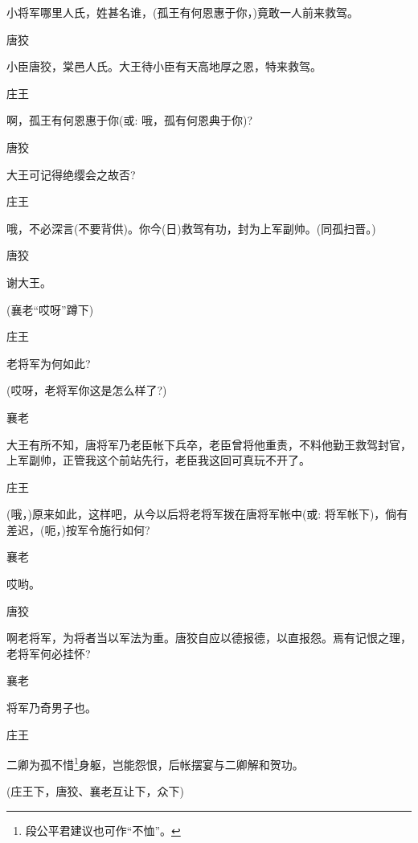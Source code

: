{小将军哪里人氏，姓甚名谁，(孤王有何恩惠于你，)竟敢一人前来救驾。

唐狡\hspace{30pt}~

小臣唐狡，棠邑人氏。大王待小臣有天高地厚之恩，特来救驾。

庄王\hspace{30pt}~

啊，孤王有何恩惠于你({\akai 或}: 哦，孤有何恩典于你)?

唐狡\hspace{30pt}~

大王可记得绝缨会之故否?

庄王

哦，不必深言(不要背供)。你今(日)救驾有功，封为上军副帅。(同孤扫晋。)

唐狡\hspace{30pt}~

谢大王。

(襄老``哎呀''蹲下)

庄王\hspace{30pt}~

老将军为何如此?

(哎呀，老将军你这是怎么样了?)

襄老

大王有所不知，唐将军乃老臣帐下兵卒，老臣曾将他重责，不料他勤王救驾封官，上军副帅，正管我这个前站先行，老臣我这回可真玩不开了。

庄王

(哦，)原来如此，这样吧，从今以后将老将军拨在唐将军帐中({\akai 或}: 将军帐下)，倘有差迟，(呃，)按军令施行如何?

襄老\hspace{30pt}~

哎哟。

唐狡

啊老将军，为将者当以军法为重。唐狡自应以德报德，以直报怨。焉有记恨之理，老将军何必挂怀?

襄老\hspace{30pt}~

将军乃奇男子也。

庄王

二卿为孤不惜\footnote{ 段公平君建议也可作``不恤''。}身躯，岂能怨恨，后帐摆宴与二卿解和贺功。

(庄王下，唐狡、襄老互让下，众下)
}

